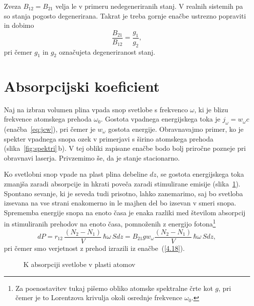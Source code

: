 \begin{remark}
 Zveza $B_{12}=B_{21}$ velja le v primeru nedegeneriranih stanj. V realnih sistemih
 pa so stanja pogosto degenerirana. Takrat je treba gornje enačbe ustrezno popraviti in dobimo
\begin{equation}
\frac{B_{21}}{B_{12}} = \frac{g_1}{g_2},
\label{eq:ABdeg}
\end{equation}
pri čemer $g_{1}$ in $g_2$ označujeta degeneriranost stanj. 
\end{remark}

\section{Absorpcijski koeficient}
Naj na izbran volumen plina vpada snop svetlobe s frekvenco
$\omega$, ki je blizu frekvence atomskega prehoda $\omega_{0}$. Gostota
vpadnega energijskega toka je $j_{\omega}=w_{\omega}c$ (enačba~\ref{eq:jcw}), 
pri čemer je $w_{\omega}$ gostota energije. Obravnavajmo primer, ko je 
spekter vpadnega snopa ozek v primerjavi s širino atomskega prehoda
(slika~\ref{fig:spektri}\,b). V tej obliki zapisane enačbe bodo bolj 
priročne pozneje pri obravnavi laserja. Privzemimo še, da
je stanje stacionarno. 

Ko svetlobni snop vpade na plast plina debeline $dz$, se gostota
energijskega toka zmanjša zaradi absorpcije in hkrati poveča zaradi 
stimulirane emisije (slika~\ref{fig:abs}). 
Spontano sevanje, ki je seveda tudi prisotno, lahko zanemarimo, saj
bo svetloba izsevana na vse strani enakomerno in le majhen del bo izsevan v smeri snopa.
Sprememba energije snopa na enoto časa je enaka razliki med 
številom absorpcij in stimuliranih prehodov na enoto časa, pomnoženih z 
energijo fotona\footnote{Za poenostavitev tukaj pišemo obliko atomske spektralne črte kot $g$, 
pri čemer je to Lorentzova krivulja okoli osrednje frekvence $\omega_0$.}
\begin{equation}
dP=r_{12}\,\frac{(N_{2}-N_{1})}{V} \, \hbar\omega \,S dz= 
B_{21}g w_{\omega} \frac{(N_{2}-N_{1})}{V}\, \hbar\omega \,S dz,
\label{4.28}
\end{equation}
pri čemer smo verjetnost z prehod izrazili iz 
enačbe~(\ref{4.18}).
\begin{figure}[h]
\centering
\def\svgwidth{50truemm} 

\caption{K absorpciji svetlobe v plasti atomov}
\label{fig:abs}
\end{figure}

